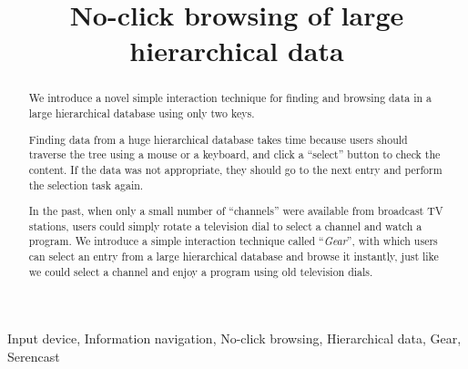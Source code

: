 \documentclass[conference]{IEEEtran}
\begin{document}
\title{No-click browsing of large hierarchical data}
%
%

\author{
}

\IEEEoverridecommandlockouts
{}

\maketitle

\IEEEpubidadjcol

\begin{abstract}
We introduce a novel simple interaction technique for finding and browsing
data in a large hierarchical database using only two keys.

Finding data from a huge hierarchical database takes time
because users should traverse the tree using a mouse or a keyboard,
and click a ``select'' button to check the content.
If the data was not appropriate,
they should go to the next entry and perform the selection task again.

In the past, when only a small number of ``channels'' were available
from broadcast TV stations, users could simply rotate
a television dial to select a channel and watch a program.
We introduce a simple interaction technique called ``\textit{Gear}'',
with which users can select an entry from a large hierarchical database and
browse it instantly, just like we could select a channel and enjoy a program
using old television dials.
\end{abstract}

\begin{IEEEkeywords}
  Input device, Information navigation, No-click browsing,
  Hierarchical data, Gear, Serencast
\end{IEEEkeywords}
\end{document}
